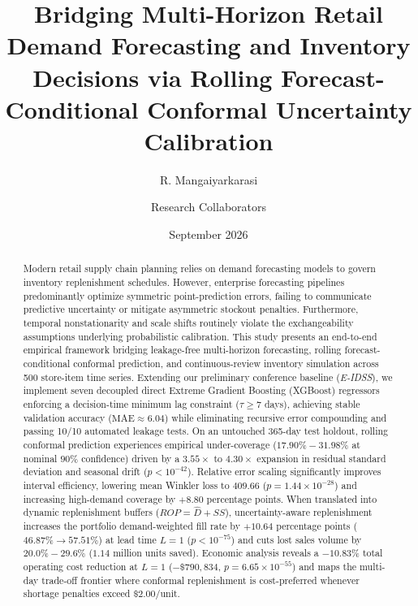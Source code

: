 \documentclass[11pt,a4paper]{article}
\title{\textbf{Bridging Multi-Horizon Retail Demand Forecasting and Inventory Decisions via Rolling Forecast-Conditional Conformal Uncertainty Calibration}}
\author[1,*]{R. Mangaiyarkarasi}
\author[1]{Research Collaborators}
\affil[1]{Department of Computer Science and Engineering}
\affil[*]{Corresponding author: \texttt{author@institution.edu}}
\date{September 2026}
\begin{document}
\maketitle

\begin{abstract}
\noindent Modern retail supply chain planning relies on demand forecasting models to govern inventory replenishment schedules. However, enterprise forecasting pipelines predominantly optimize symmetric point-prediction errors, failing to communicate predictive uncertainty or mitigate asymmetric stockout penalties. Furthermore, temporal nonstationarity and scale shifts routinely violate the exchangeability assumptions underlying probabilistic calibration. This study presents an end-to-end empirical framework bridging leakage-free multi-horizon forecasting, rolling forecast-conditional conformal prediction, and continuous-review inventory simulation across 500 store-item time series. Extending our preliminary conference baseline (\emph{E-IDSS}), we implement seven decoupled direct Extreme Gradient Boosting (XGBoost) regressors enforcing a decision-time minimum lag constraint ($\tau \ge 7$ days), achieving stable validation accuracy ($\text{MAE} \approx 6.04$) while eliminating recursive error compounding and passing 10/10 automated leakage tests. On an untouched 365-day test holdout, rolling conformal prediction experiences empirical under-coverage ($17.90\%-31.98\%$ at nominal $90\%$ confidence) driven by a $3.55\times$ to $4.30\times$ expansion in residual standard deviation and seasonal drift ($p < 10^{-42}$). Relative error scaling significantly improves interval efficiency, lowering mean Winkler loss to $409.66$ ($p = 1.44 \times 10^{-28}$) and increasing high-demand coverage by $+8.80$ percentage points. When translated into dynamic replenishment buffers ($ROP = \hat{D} + SS$), uncertainty-aware replenishment increases the portfolio demand-weighted fill rate by $+10.64$ percentage points ($46.87\% \to 57.51\%$) at lead time $L=1$ ($p < 10^{-75}$) and cuts lost sales volume by $20.0\%-29.6\%$ ($1.14$ million units saved). Economic analysis reveals a $-10.83\%$ total operating cost reduction at $L=1$ ($-\$790,834$, $p = 6.65 \times 10^{-55}$) and maps the multi-day trade-off frontier where conformal replenishment is cost-preferred whenever shortage penalties exceed $\$2.00/\text{unit}$.
\end{abstract}
\end{document}
